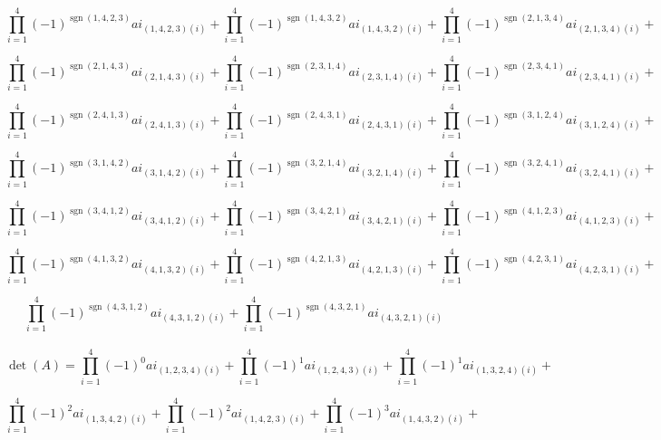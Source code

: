 \documentclass[12pt]{article}
\begin{document}
    $$\prod_{i=1}^{4} (-1)^ {\operatorname{sgn}(1, 4, 2, 3)}  ai_{(1, 4, 2, 3) (i)} + 
    \prod_{i=1}^{4} (-1)^ {\operatorname{sgn}(1, 4, 3, 2)}  ai_{(1, 4, 3, 2) (i)} + 
    \prod_{i=1}^{4} (-1)^ {\operatorname{sgn}(2, 1, 3, 4)}  ai_{(2, 1, 3, 4) (i)} + $$
    
    $$\prod_{i=1}^{4} (-1)^ {\operatorname{sgn}(2, 1, 4, 3)}  ai_{(2, 1, 4, 3) (i)} + 
    \prod_{i=1}^{4} (-1)^ {\operatorname{sgn}(2, 3, 1, 4)}  ai_{(2, 3, 1, 4) (i)} + 
    \prod_{i=1}^{4} (-1)^ {\operatorname{sgn}(2, 3, 4, 1)}  ai_{(2, 3, 4, 1) (i)} + $$
    
    $$\prod_{i=1}^{4} (-1)^ {\operatorname{sgn}(2, 4, 1, 3)}  ai_{(2, 4, 1, 3) (i)} + 
    \prod_{i=1}^{4} (-1)^ {\operatorname{sgn}(2, 4, 3, 1)}  ai_{(2, 4, 3, 1) (i)} + 
    \prod_{i=1}^{4} (-1)^ {\operatorname{sgn}(3, 1, 2, 4)}  ai_{(3, 1, 2, 4) (i)} + $$
    
    $$\prod_{i=1}^{4} (-1)^ {\operatorname{sgn}(3, 1, 4, 2)}  ai_{(3, 1, 4, 2) (i)} + 
    \prod_{i=1}^{4} (-1)^ {\operatorname{sgn}(3, 2, 1, 4)}  ai_{(3, 2, 1, 4) (i)} + 
    \prod_{i=1}^{4} (-1)^ {\operatorname{sgn}(3, 2, 4, 1)}  ai_{(3, 2, 4, 1) (i)} + $$
    
    $$\prod_{i=1}^{4} (-1)^ {\operatorname{sgn}(3, 4, 1, 2)}  ai_{(3, 4, 1, 2) (i)} + 
    \prod_{i=1}^{4} (-1)^ {\operatorname{sgn}(3, 4, 2, 1)}  ai_{(3, 4, 2, 1) (i)} + 
    \prod_{i=1}^{4} (-1)^ {\operatorname{sgn}(4, 1, 2, 3)}  ai_{(4, 1, 2, 3) (i)} + $$
    
    $$\prod_{i=1}^{4} (-1)^ {\operatorname{sgn}(4, 1, 3, 2)}  ai_{(4, 1, 3, 2) (i)} + 
    \prod_{i=1}^{4} (-1)^ {\operatorname{sgn}(4, 2, 1, 3)}  ai_{(4, 2, 1, 3) (i)} + 
    \prod_{i=1}^{4} (-1)^ {\operatorname{sgn}(4, 2, 3, 1)}  ai_{(4, 2, 3, 1) (i)} + $$
    
    $$\prod_{i=1}^{4} (-1)^ {\operatorname{sgn}(4, 3, 1, 2)}  ai_{(4, 3, 1, 2) (i)} + 
    \prod_{i=1}^{4} (-1)^ {\operatorname{sgn}(4, 3, 2, 1)}  ai_{(4, 3, 2, 1) (i)} $$

\newpage

\paragraph{}
    $$\operatorname{det}(A)= \prod_{i=1}^{4} (-1)^0  ai_{(1, 2, 3, 4) (i)} + 
    \prod_{i=1}^{4} (-1)^1  ai_{(1, 2, 4, 3) (i)} +
    \prod_{i=1}^{4} (-1)^1  ai_{(1, 3, 2, 4) (i)} +$$
    
    $$\prod_{i=1}^{4} (-1)^2  ai_{ (1, 3, 4, 2) (i)} + 
    \prod_{i=1}^{4} (-1)^2  ai_{ (1, 4, 2, 3) (i)} +
    \prod_{i=1}^{4} (-1)^3  ai_{ (1, 4, 3, 2) (i)} +$$
    
\end{document}
